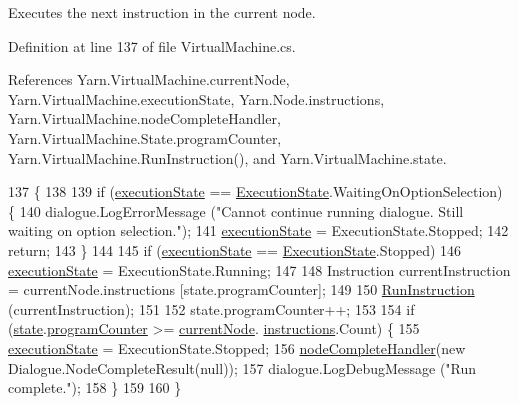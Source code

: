 Executes the next instruction in the current node. 



Definition at line 137 of file Virtual\-Machine.\-cs.



References Yarn.\-Virtual\-Machine.\-current\-Node, Yarn.\-Virtual\-Machine.\-execution\-State, Yarn.\-Node.\-instructions, Yarn.\-Virtual\-Machine.\-node\-Complete\-Handler, Yarn.\-Virtual\-Machine.\-State.\-program\-Counter, Yarn.\-Virtual\-Machine.\-Run\-Instruction(), and Yarn.\-Virtual\-Machine.\-state.


\begin{DoxyCode}
137                                 \{
138 
139             \textcolor{keywordflow}{if} (\hyperlink{a00152_a66491da06023dabfb63d09e6ccbba74f}{executionState} == \hyperlink{a00152_add28fa9c8a45ca579e84d05920bbc42d}{ExecutionState}.WaitingOnOptionSelection) \{
140                 dialogue.LogErrorMessage (\textcolor{stringliteral}{"Cannot continue running dialogue. Still waiting on option
       selection."});
141                 \hyperlink{a00152_a66491da06023dabfb63d09e6ccbba74f}{executionState} = ExecutionState.Stopped;
142                 \textcolor{keywordflow}{return};
143             \}
144 
145             \textcolor{keywordflow}{if} (\hyperlink{a00152_a66491da06023dabfb63d09e6ccbba74f}{executionState} == \hyperlink{a00152_add28fa9c8a45ca579e84d05920bbc42d}{ExecutionState}.Stopped)
146                 \hyperlink{a00152_a66491da06023dabfb63d09e6ccbba74f}{executionState} = ExecutionState.Running;
147 
148             Instruction currentInstruction = currentNode.instructions [state.programCounter];
149 
150             \hyperlink{a00152_ad2caf9ca4f00cdcbd58983be7c106971}{RunInstruction} (currentInstruction);
151 
152             state.programCounter++;
153 
154             \textcolor{keywordflow}{if} (\hyperlink{a00152_a70f2ce6201cdd2430ceaa764ac614ca0}{state}.\hyperlink{a00155_a2c76546b54b4fb573d7f14d79ce230a3}{programCounter} >= \hyperlink{a00152_ab7594e14981ad75cecea3b2e7dcf895c}{currentNode}.
      \hyperlink{a00041_a156723a9252b62d288ddf611939ea7c3}{instructions}.Count) \{
155                 \hyperlink{a00152_a66491da06023dabfb63d09e6ccbba74f}{executionState} = ExecutionState.Stopped;
156                 \hyperlink{a00152_a5129c63e67e2d4e2780d86b8351320a2}{nodeCompleteHandler}(\textcolor{keyword}{new} Dialogue.NodeCompleteResult(null));
157                 dialogue.LogDebugMessage (\textcolor{stringliteral}{"Run complete."});
158             \}
159 
160         \}
\end{DoxyCode}


